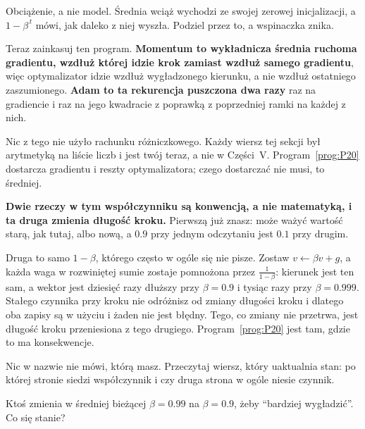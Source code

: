 \begin{fr}
\begin{ansblock}
Obciążenie, a nie model. Średnia wciąż wychodzi ze swojej zerowej
inicjalizacji, a $1 - \beta^{\,t}$ mówi, jak daleko z niej wyszła. Podziel
przez to, a wspinaczka znika.
\end{ansblock}

Teraz zainkasuj ten program. \textbf{Momentum to wykładnicza średnia ruchoma
gradientu, wzdłuż której idzie krok zamiast wzdłuż samego gradientu}, więc
optymalizator idzie wzdłuż wygładzonego kierunku, a nie wzdłuż ostatniego
zaszumionego. \textbf{Adam to ta rekurencja
puszczona dwa razy} \dash{} raz na gradiencie i raz na jego kwadracie \dash{}
z poprawką z poprzedniej ramki na każdej z nich.

Nic z tego nie użyło rachunku różniczkowego. Każdy wiersz tej sekcji był
arytmetyką na liście liczb i jest twój teraz, a nie w Części~V.
Program~\ref{prog:P20} dostarcza gradientu i reszty optymalizatora; czego
dostarczać nie musi, to średniej.

\begin{warning}
\textbf{Dwie rzeczy w tym współczynniku są konwencją, a nie matematyką, i ta
druga zmienia długość kroku.} Pierwszą już znasz: może ważyć wartość starą,
jak tutaj, albo nową, a $\num{0.9}$ przy jednym odczytaniu jest $\num{0.1}$
przy drugim.

Druga to samo $1 - \beta$, którego często w ogóle się nie pisze. Zostaw
$v \leftarrow \beta v + g$, a każda waga w rozwiniętej sumie zostaje
pomnożona przez $\frac{1}{1-\beta}$: kierunek jest ten sam, a wektor jest
dziesięć razy dłuższy przy $\beta = \num{0.9}$ i tysiąc razy przy
$\beta = \num{0.999}$. Stałego czynnika przy kroku nie odróżnisz od zmiany
długości kroku i dlatego oba zapisy są w użyciu i żaden nie jest błędny. Tego,
co zmiany nie przetrwa, jest długość kroku przeniesiona z tego drugiego.
Program~\ref{prog:P20} jest tam, gdzie to ma konsekwencje.

Nic w nazwie nie mówi, którą masz. Przeczytaj wiersz, który uaktualnia stan:
po której stronie siedzi współczynnik i czy druga strona w ogóle niesie
czynnik.
\end{warning}

Ktoś zmienia w średniej bieżącej $\beta = \num{0.99}$ na $\beta = \num{0.9}$,
żeby \enquote{bardziej wygładzić}. Co się stanie?
\nextframe
\end{fr}

